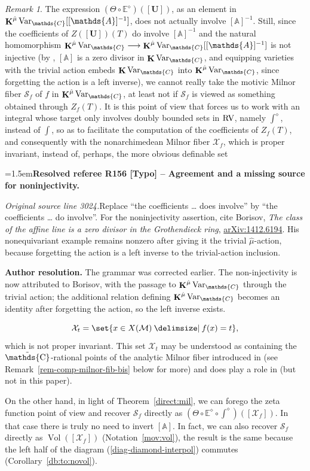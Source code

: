 \documentclass[12pt]{amsart}
\newcommand{\ResolvedRefereeRemark}[5]{%
  \par\medskip\begingroup\normalfont\small\color{gray}%
  \emergencystretch=1.5em\noindent\textbf{Resolved referee R#1 [#2] -- #3.}\par\nobreak\noindent #4\par
  \medskip\color{ResolutionGreen}\noindent\textbf{Author resolution.} #5\par
  \endgroup\medskip
}
\theoremstyle{plain}
\theoremstyle{definition}
\theoremstyle{remark}
\newtheorem{rem}[thm]{Remark}
\numberwithin{equation}{section}
\theoremstyle{plain}
\newcommand{\RV}{\textup{RV}}
\newcommand{\MM}{\mdl M}
\newcommand{\A}{\mathds{A}}
\newcommand{\C}{\mathds{C}}
\newcommand{\0}{\emptyset}
\newcommand{\mdl}[1]{\mathcal{#1}}  %
\newcommand{\bb}[1]{\mathbb{#1}}
\newcommand{\fun}{\longrightarrow}
\providecommand\given{}
\newcommand\SetSymbol[1][]{%
\nonscript \: #1 \vert
\allowbreak
\nonscript\:
\mathopen{}}
\renewcommand\given{\SetSymbol[\delimsize]}
\DeclareMathOperator{\ggk}{\mathbf{K}}
\newcommand{\var}{\textup{Var}}
\DeclareMathOperator{\puC}{\tilde \C}
\DeclareMathOperator{\Vol}{Vol}
\newcommand{\gmv}{\ggk^{\hat \mu}\var_{\C}}
\begin{document}
\begin{rem}\label{rem-comp-milnor-fib}
The expression $(\Theta \circ \bb E^{\diamond})([\bm U])$, as an element in $\gmv[[\A]^{-1}]$, does not actually involve  $[\A]^{-1}$. Still, since the coefficients of $Z([\bm U])(T)$ do involve $[\A]^{-1}$ and the natural homomorphism $\gmv \fun \gmv[[\A]^{-1}]$ is not injective (by \cite{borisov:zero:divisor}, $[\A]$ is a zero divisor in $\ggk \var_{\C}$, and equipping varieties with the trivial action embeds $\ggk \var_{\C}$ into $\gmv$, since forgetting the action is a left inverse), we cannot really take  the motivic Milnor fiber $\mathscr S_f$ of $f$ in $\gmv$, at least not if $\mathscr S_f$ is viewed as something obtained through  $Z_f(T)$. It is this point of view that forces us to work with an integral whose target only involves doubly bounded sets in $\RV$, namely $\int^{\diamond}$, instead of $\int$, so as to facilitate the computation of the coefficients of $Z_f(T)$, and consequently with the nonarchimedean Milnor fiber $\mdl X_f$, which is proper invariant, instead of, perhaps, the more obvious definable set

\ResolvedRefereeRemark{156}{Typo}{Agreement and a missing source for noninjectivity}{%
\textit{Original source line 3024.}\quad Replace ``the coefficients \ldots{} does involve'' by ``the coefficients \ldots{} do involve''. For the noninjectivity assertion, cite Borisov, \emph{The class of the affine line is a zero divisor in the Grothendieck ring}, \href{https://arxiv.org/abs/1412.6194}{arXiv:1412.6194}. His nonequivariant example remains nonzero after giving it the trivial $\hat\mu$-action, because forgetting the action is a left inverse to the trivial-action inclusion.
}{The grammar was corrected earlier. The non-injectivity is now attributed to Borisov, with the passage to $\gmv$ through the trivial action; the additional relation defining $\gmv$ becomes an identity after forgetting the action, so the left inverse exists.}
\[
\mdl X_t = \set{x \in X(\MM) \given f(x) = t},
\]
which is not proper invariant. This set $\mdl X_t$ may be understood as containing the $\puC$-rational points of  the analytic Milnor fiber introduced in \cite{nicaise:sebag:motivic:serre} (see Remark~\ref{rem-comp-milnor-fib-bis} below for more) and does play a role in \cite{hru:loe:lef} (but not in this paper).


On the other hand, in light of Theorem~\ref{direct:mil}, we can forego the zeta function point of view and recover $\mathscr S_f$ directly as $(\Theta \circ \bb E^{\diamond} \circ \int^{\diamond})([\mdl X_f])$. In that case there is truly no need to invert $[\A]$. In fact, we can also recover $\mathscr S_f$  directly as  $\Vol([\mdl X_f])$ (Notation~\ref{mov:vol}), the result is the same because the left half of the diagram (\ref{diag-diamond-interpol}) commutes (Corollary~\ref{db:to:novol}).
\end{rem}
\end{document}
